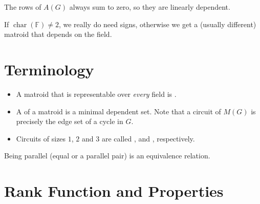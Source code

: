 \begin{note}
    The rows of \(A(G)\) always sum to zero, so they are linearly dependent.
\end{note}

\begin{note}
    If \(\operatorname{char}(\mathbb{F}) \neq 2\), we really do need signs, otherwise we get a (usually different) matroid that depends on the field.
\end{note}

\section{Terminology}

\begin{itemize}
    \item A matroid that is representable over \emph{every} field is .
    \item A  of a matroid is a minimal dependent set.
    Note that a circuit of \(M(G)\) is precisely the edge set of a cycle in \(G\).
    \item Circuits of sizes \(1\), \(2\) and \(3\) are called ,  and , respectively.
\end{itemize}

\begin{note}
    Being parallel (equal or a parallel pair) is an equivalence relation.
\end{note}

\section{Rank Function and Properties}


